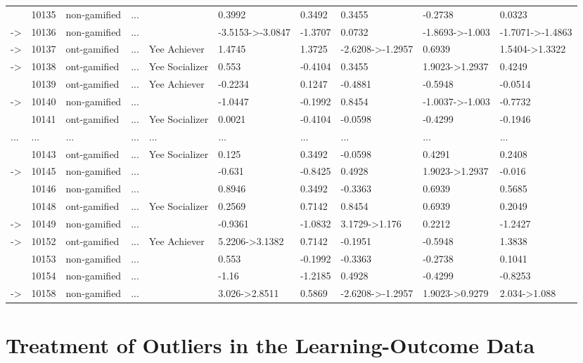 \begin{landscape}
{\begin{longtable}{llllllllll}
&10135&non-gamified&...&&0.3992&0.3492&0.3455&-0.2738&0.0323\tabularnewline
-\textgreater &10136&non-gamified&...&&-3.5153-\textgreater -3.0847&-1.3707&0.0732&-1.8693-\textgreater -1.003&-1.7071-\textgreater -1.4863\tabularnewline
-\textgreater &10137&ont-gamified&...&Yee Achiever&1.4745&1.3725&-2.6208-\textgreater -1.2957&0.6939&1.5404-\textgreater 1.3322\tabularnewline
-\textgreater &10138&ont-gamified&...&Yee Socializer&0.553&-0.4104&0.3455&1.9023-\textgreater 1.2937&0.4249\tabularnewline
&10139&ont-gamified&...&Yee Achiever&-0.2234&0.1247&-0.4881&-0.5948&-0.0514\tabularnewline
-\textgreater &10140&non-gamified&...&&-1.0447&-0.1992&0.8454&-1.0037-\textgreater -1.003&-0.7732\tabularnewline
&10141&ont-gamified&...&Yee Socializer&0.0021&-0.4104&-0.0598&-0.4299&-0.1946\tabularnewline
...&...&...&...&...&...&...&...&...&...\tabularnewline
&10143&ont-gamified&...&Yee Socializer&0.125&0.3492&-0.0598&0.4291&0.2408\tabularnewline
-\textgreater &10145&non-gamified&...&&-0.631&-0.8425&0.4928&1.9023-\textgreater 1.2937&-0.016\tabularnewline
&10146&non-gamified&...&&0.8946&0.3492&-0.3363&0.6939&0.5685\tabularnewline
&10148&ont-gamified&...&Yee Socializer&0.2569&0.7142&0.8454&0.6939&0.2049\tabularnewline
-\textgreater &10149&non-gamified&...&&-0.9361&-1.0832&3.1729-\textgreater 1.176&0.2212&-1.2427\tabularnewline
-\textgreater &10152&ont-gamified&...&Yee Achiever&5.2206-\textgreater 3.1382&0.7142&-0.1951&-0.5948&1.3838\tabularnewline
&10153&non-gamified&...&&0.553&-0.1992&-0.3363&-0.2738&0.1041\tabularnewline
&10154&non-gamified&...&&-1.16&-1.2185&0.4928&-0.4299&-0.8253\tabularnewline
-\textgreater &10158&non-gamified&...&&3.026-\textgreater 2.8511&0.5869&-2.6208-\textgreater -1.2957&1.9023-\textgreater 0.9279&2.034-\textgreater 1.088\tabularnewline
\hline
\end{longtable}}\end{landscape}

\section{Treatment of Outliers in the Learning-Outcome Data}
\label{sec:outliers-learning-outcomes}






